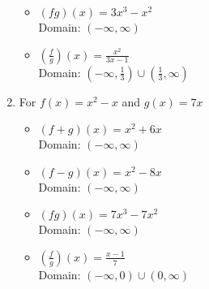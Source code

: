 \begin{enumerate}
\begin{multicols}{2}
\begin{itemize}
\item $(fg)(x) = 3x^3-x^2$ \\
      Domain: $(-\infty, \infty)$
      
      \vfill
      
      \columnbreak
      
\item $\left(\frac{f}{g}\right)(x) = \frac{x^2}{3x-1}$ \\
      Domain:  $\left(-\infty, \frac{1}{3} \right) \cup \left(\frac{1}{3}, \infty \right)$


\end{itemize}

\end{multicols}

\item For $f(x) = x^2-x$ and $g(x) = 7x$

\begin{multicols}{2}

\begin{itemize}

\item $(f+g)(x) = x^2+6x$ \\
      Domain: $(-\infty, \infty)$
      
      \vfill
      
      \columnbreak
      
\item $(f-g)(x) = x^2-8x$ \\
      Domain:  $(-\infty, \infty)$


\end{itemize}

\end{multicols}

\begin{multicols}{2}

\begin{itemize}

\item $(fg)(x) = 7x^3-7x^2$ \\
      Domain: $(-\infty, \infty)$
      
      \vfill
      
      \columnbreak
      
\item $\left(\frac{f}{g}\right)(x) = \frac{x-1}{7}$ \\
      Domain:  $\left(-\infty, 0 \right) \cup \left(0, \infty \right)$


\end{itemize}


\end{multicols}
\end{enumerate}
